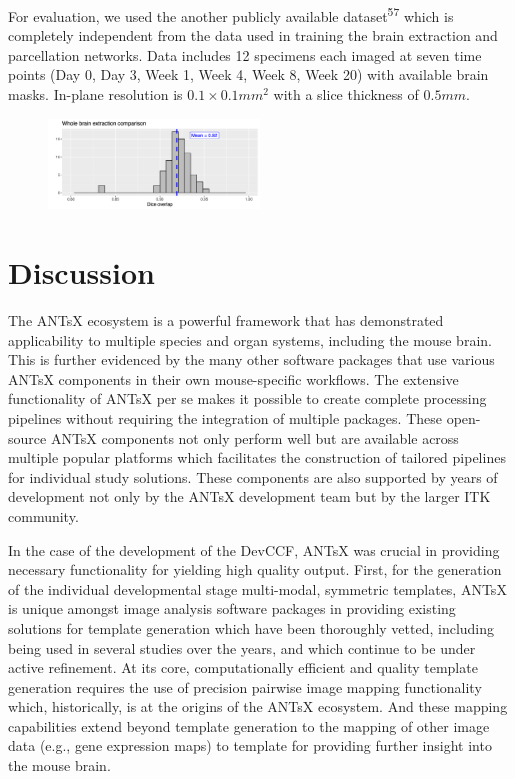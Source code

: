 \documentclass[
  12pt,
]{article}
\begin{document}
For evaluation, we used the another publicly available
dataset\textsuperscript{57} which is completely independent from the
data used in training the brain extraction and parcellation networks.
Data includes 12 specimens each imaged at seven time points (Day 0, Day
3, Week 1, Week 4, Week 8, Week 20) with available brain masks. In-plane
resolution is \(0.1 \times 0.1 mm^2\) with a slice thickness of
\(0.5 mm\).

\begin{figure}
\centering
\includegraphics[width=0.5\textwidth]{Figures/dice.png}
\caption{}
\label{fig:brainExtraction}
\end{figure}

\clearpage
\newpage

\hypertarget{discussion}{%
\section*{Discussion}\label{discussion}}

The ANTsX ecosystem is a powerful framework that has demonstrated
applicability to multiple species and organ systems, including the mouse
brain. This is further evidenced by the many other software packages
that use various ANTsX components in their own mouse-specific workflows.
The extensive functionality of ANTsX per se makes it possible to create
complete processing pipelines without requiring the integration of
multiple packages. These open-source ANTsX components not only perform
well but are available across multiple popular platforms which
facilitates the construction of tailored pipelines for individual study
solutions. These components are also supported by years of development
not only by the ANTsX development team but by the larger ITK community.

In the case of the development of the DevCCF, ANTsX was crucial in
providing necessary functionality for yielding high quality output.
First, for the generation of the individual developmental stage
multi-modal, symmetric templates, ANTsX is unique amongst image analysis
software packages in providing existing solutions for template
generation which have been thoroughly vetted, including being used in
several studies over the years, and which continue to be under active
refinement. At its core, computationally efficient and quality template
generation requires the use of precision pairwise image mapping
functionality which, historically, is at the origins of the ANTsX
ecosystem. And these mapping capabilities extend beyond template
generation to the mapping of other image data (e.g., gene expression
maps) to template for providing further insight into the mouse brain.
\end{document}
